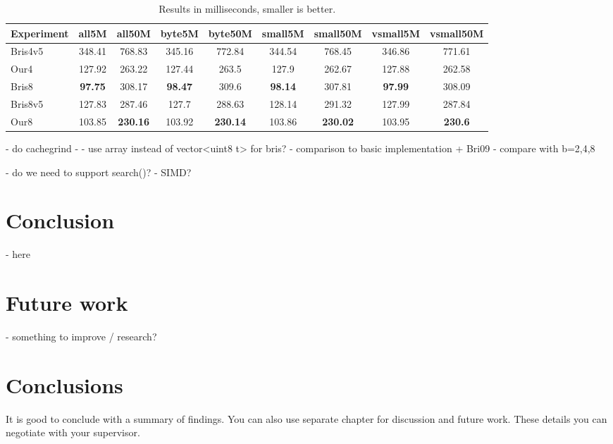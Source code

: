 \begin{table}
\centering
\caption{Results in milliseconds, smaller is better.\label{table:results1}}
\begin{tabular}{l||c c c c c c c c} 
Experiment & all5M & all50M & byte5M & byte50M & small5M & small50M & vsmall5M & vsmall50M\\ 
\hline \hline 
Bris4v5 & 348.41 & 768.83 & 345.16 & 772.84 & 344.54 & 768.45 & 346.86 & 771.61 \\
Our4    & 127.92 & 263.22 & 127.44 & 263.5  & 127.9  & 262.67 & 127.88 & 262.58 \\
Bris8   & \textbf{97.75}  & 308.17 & \textbf{98.47}  & 309.6  & \textbf{98.14}  & 307.81 & \textbf{97.99}  & 308.09 \\
Bris8v5 & 127.83 & 287.46 & 127.7  & 288.63 & 128.14 & 291.32 & 127.99 & 287.84 \\
Our8    & 103.85 & \textbf{230.16} & 103.92 & \textbf{230.14} & 103.86 & \textbf{230.02} & 103.95 & \textbf{230.6} \\

\hline
%
\end{tabular}
\end{table}



 - do cachegrind
 - 
 - use array instead of vector<uint8 t> for bris?
- comparison to basic implementation + Bri09
  - compare with b=2,4,8

 - do we need to support search()?
 - SIMD?


\chapter{Conclusion}
 - here

\chapter{Future work}
 - something to improve / research?

\chapter{Conclusions\label{chapter:conclusions}}

It is good to conclude with a summary of findings. You can also use separate chapter for discussion and future work. These details you can negotiate with your supervisor.
